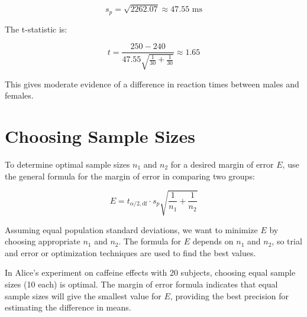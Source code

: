 \documentclass{article}
\begin{document}
\[
s_p = \sqrt{2262.07} \approx 47.55 \text{ ms}
\]

The t-statistic is:

\[
t = \frac{250 - 240}{47.55 \sqrt{\frac{1}{30} + \frac{1}{30}}} \approx 1.65
\]

This gives moderate evidence of a difference in reaction times between males and females.

\section*{Choosing Sample Sizes}

To determine optimal sample sizes \( n_1 \) and \( n_2 \) for a desired margin of error \( E \), use the general formula for the margin of error in comparing two groups:

\[
E = t_{\alpha/2, \text{df}} \cdot s_p \sqrt{\frac{1}{n_1} + \frac{1}{n_2}}
\]

Assuming equal population standard deviations, we want to minimize \( E \) by choosing appropriate \( n_1 \) and \( n_2 \). The formula for \( E \) depends on \( n_1 \) and \( n_2 \), so trial and error or optimization techniques are used to find the best values.

In Alice's experiment on caffeine effects with 20 subjects, choosing equal sample sizes (10 each) is optimal. The margin of error formula indicates that equal sample sizes will give the smallest value for \( E \), providing the best precision for estimating the difference in means.
\end{document}
